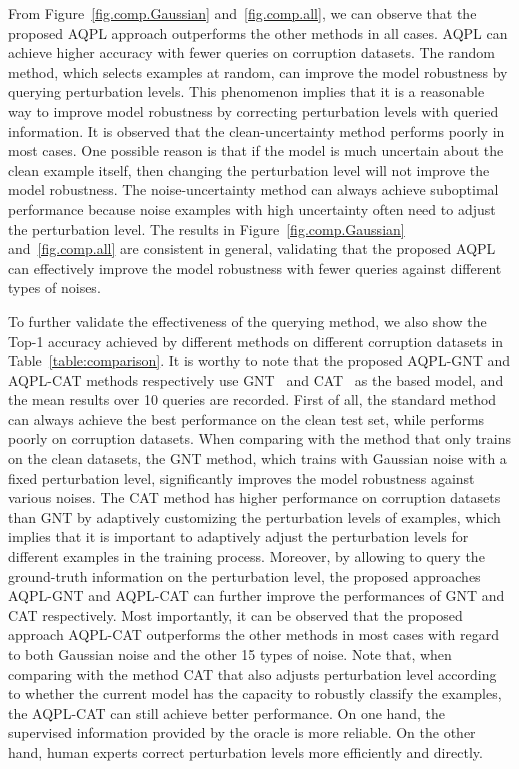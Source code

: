 \documentclass[letterpaper]{article} %
\begin{document}
From Figure~\ref{fig.comp.Gaussian} and~\ref{fig.comp.all}, we can observe that the proposed AQPL approach outperforms the other methods in all cases. AQPL can achieve higher accuracy with fewer queries on corruption datasets. The random method, which selects examples at random, can improve the model robustness by querying perturbation levels. This phenomenon implies that it is a reasonable way to improve model robustness by correcting perturbation levels with queried information. It is observed that the clean-uncertainty method performs poorly in most cases. One possible reason is that if the model is much uncertain about the clean example itself, then changing the perturbation level will not improve the model robustness. The noise-uncertainty method can always achieve suboptimal performance because noise examples with high uncertainty often need to adjust the perturbation level. The results in Figure~\ref{fig.comp.Gaussian} and~\ref{fig.comp.all} are consistent in general, validating that the proposed  AQPL can effectively improve the model robustness with fewer queries against different types of noises.

To further validate the effectiveness of the querying method, we also show the Top-1 accuracy achieved by different methods on different corruption datasets in Table~\ref{table:comparison}. It is worthy to note that the proposed AQPL-GNT and AQPL-CAT methods respectively use GNT~\cite{rusak2020increasing} and CAT~\cite{cheng2020cat} as the based model, and the mean results over 10 queries are recorded. First of all, the standard method can always achieve the best performance on the clean test set, while performs poorly on corruption datasets. When comparing with the method that only trains on the clean datasets, the GNT method, which trains with Gaussian noise with a fixed perturbation level, significantly improves the model robustness against various noises. The CAT method has higher performance on corruption datasets than GNT by adaptively customizing the perturbation levels of examples, which implies that it is important to adaptively adjust the perturbation levels for different examples in the training process. Moreover, by allowing to query the ground-truth information on the perturbation level, the proposed approaches AQPL-GNT and AQPL-CAT can further improve the performances of GNT and CAT respectively. Most importantly, it can be observed that the proposed approach AQPL-CAT outperforms the other methods in most cases with regard to both Gaussian noise and the other 15 types of noise. Note that, when comparing with the method CAT that also adjusts perturbation level according to whether the current model has the capacity to robustly classify the examples, the AQPL-CAT can still achieve better performance. On one hand, the supervised information provided by the oracle is more reliable. On the other hand, human experts correct perturbation levels more efficiently and directly.
\end{document}
